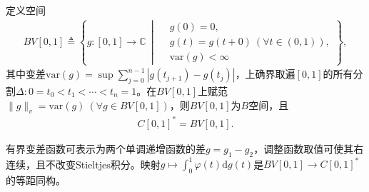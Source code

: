 \documentclass[../../main.tex]{subfiles}%
\begin{document}
\begin{example}
定义空间
\begin{align*}
BV[0,1]\triangleq\left\{g:[0,1]\to\mathbb{C}\,\middle|\,
\begin{aligned}
&g(0)=0,\\
&g(t)=g(t+0)\ (\forall t\in(0,1)),\\
&\mathrm{var}(g)<\infty
\end{aligned}
\right\},
\end{align*}
其中变差$\mathrm{var}(g)=\sup\sum\limits_{j=0}^{n-1}|g(t_{j+1})-g(t_j)|$，上确界取遍$[0,1]$的所有分割$\Delta:0=t_0<t_1<\cdots<t_n=1$。在$BV[0,1]$上赋范$\|g\|_v=\mathrm{var}(g)\ (\forall g\in BV[0,1])$，则$BV[0,1]$为$B$空间，且
\begin{align}
C[0,1]^*=BV[0,1].\label{eq:cconj}
\end{align}
\end{example}
\begin{remark}
有界变差函数可表示为两个单调递增函数的差$g=g_1-g_2$，调整函数取值可使其右连续，且不改变Stieltjes积分。映射$g\mapsto\int_{0}^{1}\varphi(t)\mathrm{d}g(t)$是$BV[0,1]\to C[0,1]^*$的等距同构。
\end{remark}
\end{document}
